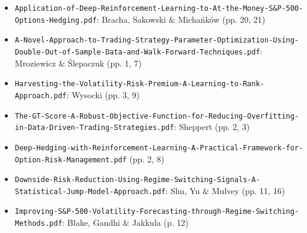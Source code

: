 \documentclass{article}
\begin{document}
\begin{itemize}

\item \texttt{Application-\allowbreak{}of-\allowbreak{}Deep-\allowbreak{}Reinforcement-\allowbreak{}Learning-\allowbreak{}to-\allowbreak{}At-\allowbreak{}the-\allowbreak{}Money-\allowbreak{}S\&P-\allowbreak{}500-\allowbreak{}Options-\allowbreak{}Hedging.\allowbreak{}pdf}: Bracha, Sakowski \& Michańków (pp. 20, 21)

\item \texttt{A-\allowbreak{}Novel-\allowbreak{}Approach-\allowbreak{}to-\allowbreak{}Trading-\allowbreak{}Strategy-\allowbreak{}Parameter-\allowbreak{}Optimization-\allowbreak{}Using-\allowbreak{}Double-\allowbreak{}Out-\allowbreak{}of-\allowbreak{}Sample-\allowbreak{}Data-\allowbreak{}and-\allowbreak{}Walk-\allowbreak{}Forward-\allowbreak{}Techniques.\allowbreak{}pdf}: Mroziewicz \& \'{S}lepaczuk (pp. 1, 7)

\item \texttt{Harvesting-\allowbreak{}the-\allowbreak{}Volatility-\allowbreak{}Risk-\allowbreak{}Premium-\allowbreak{}A-\allowbreak{}Learning-\allowbreak{}to-\allowbreak{}Rank-\allowbreak{}Approach.\allowbreak{}pdf}: Wysocki (pp. 3, 9)

\item \texttt{The-\allowbreak{}GT-\allowbreak{}Score-\allowbreak{}A-\allowbreak{}Robust-\allowbreak{}Objective-\allowbreak{}Function-\allowbreak{}for-\allowbreak{}Reducing-\allowbreak{}Overfitting-\allowbreak{}in-\allowbreak{}Data-\allowbreak{}Driven-\allowbreak{}Trading-\allowbreak{}Strategies.\allowbreak{}pdf}: Sheppert (pp. 2, 3)

\item \texttt{Deep-\allowbreak{}Hedging-\allowbreak{}with-\allowbreak{}Reinforcement-\allowbreak{}Learning-\allowbreak{}A-\allowbreak{}Practical-\allowbreak{}Framework-\allowbreak{}for-\allowbreak{}Option-\allowbreak{}Risk-\allowbreak{}Management.\allowbreak{}pdf} (pp. 2, 8)

\item \texttt{Downside-\allowbreak{}Risk-\allowbreak{}Reduction-\allowbreak{}Using-\allowbreak{}Regime-\allowbreak{}Switching-\allowbreak{}Signals-\allowbreak{}A-\allowbreak{}Statistical-\allowbreak{}Jump-\allowbreak{}Model-\allowbreak{}Approach.\allowbreak{}pdf}: Shu, Yu \& Mulvey (pp. 11, 16)

\item \texttt{Improving-\allowbreak{}S\&P-\allowbreak{}500-\allowbreak{}Volatility-\allowbreak{}Forecasting-\allowbreak{}through-\allowbreak{}Regime-\allowbreak{}Switching-\allowbreak{}Methods.\allowbreak{}pdf}: Blake, Gandhi \& Jakkula (p. 12)

\end{itemize}
\end{document}
